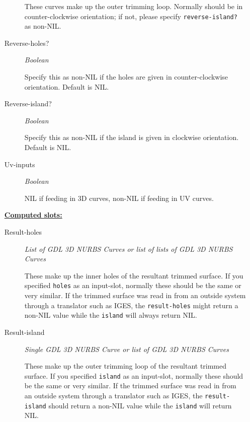 \documentclass [11pt]{book}
\begin{document}
\begin{itemize}
\begin{description}
 These curves make up the outer trimming loop. Normally should
be in counter-clockwise orientation; if not, please specify \texttt{reverse-island?} as non-NIL.




\item [Reverse-holes?]
\emph{Boolean}

 Specify this as non-NIL if the holes are given in counter-clockwise orientation. Default is NIL.




\item [Reverse-island?]
\emph{Boolean}

 Specify this as non-NIL if the island is given in clockwise orientation. Default is NIL.




\item [Uv-inputs]
\emph{Boolean}

 NIL if feeding in 3D curves, non-NIL if feeding in UV curves.




\end{description}






\textbf{
\underline{Computed slots:}}

\begin{description}

\item [Result-holes]
\emph{List of GDL 3D NURBS Curves or list of lists of GDL 3D NURBS Curves}

 These make up the inner holes of the resultant
trimmed surface. If you specified \texttt{holes} as an input-slot, normally these should be the same
or very similar. If the trimmed surface was read in from an outside system through a translator such as IGES,
the \texttt{result-holes} might return a non-NIL value while the \texttt{island} will always return NIL.




\item [Result-island]
\emph{Single GDL 3D NURBS Curve or list of GDL 3D NURBS Curves}

 These make up the outer trimming loop of the resultant
trimmed surface. If you specified \texttt{island} as an input-slot, normally these should be the same
or very similar. If the trimmed surface was read in from an outside system through a translator such as IGES,
the \texttt{result-island} should return a non-NIL value while the \texttt{island} will return NIL.





\end{description}
\end{itemize}
\end{document}

